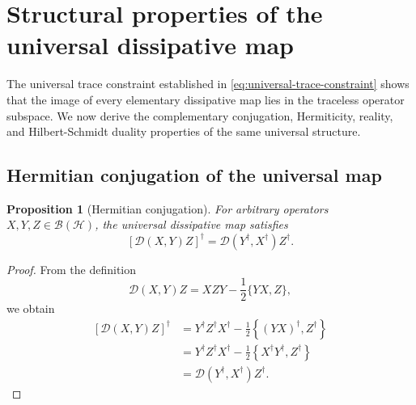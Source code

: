 \documentclass[notitlepage,aip,reprint,onecolumn]{revtex4-1}
\newtheorem{proposition}[theorem]{Proposition}
\theoremstyle{definition}
\begin{document}
\section{Structural properties of the universal dissipative map}\label{Sec:StructuralPropertiesDissipativeMap}

The universal trace constraint established in \eqref{eq:universal-trace-constraint} shows that the image of every elementary dissipative map lies in the traceless operator subspace. We now derive the complementary conjugation, Hermiticity, reality, and Hilbert-Schmidt duality properties of the same universal structure.

\subsection{Hermitian conjugation of the universal map}

\begin{proposition}[Hermitian conjugation]
For arbitrary operators \(X,Y,Z\in\mathcal B(\mathcal H)\), the universal dissipative map satisfies
\begin{equation}\label{eq:universal-Hermitian-conjugation}
    \left[
    \mathcal D(X,Y)Z
    \right]^\dagger
    =
    \mathcal D(Y^\dagger,X^\dagger)Z^\dagger.
\end{equation}
\end{proposition}

\begin{proof}
From the definition
\[
    \mathcal D(X,Y)Z
    =
    XZY
    -
    \frac12\{YX,Z\},
\]
we obtain
\begin{align*}
    \left[
    \mathcal D(X,Y)Z
    \right]^\dagger
    &=
    Y^\dagger Z^\dagger X^\dagger
    -
    \frac12
    \left\{
    (YX)^\dagger,Z^\dagger
    \right\}
    \\
    &=
    Y^\dagger Z^\dagger X^\dagger
    -
    \frac12
    \left\{
    X^\dagger Y^\dagger,Z^\dagger
    \right\}
    \\
    &=
    \mathcal D(Y^\dagger,X^\dagger)Z^\dagger.
\end{align*}
\end{proof}
\end{document}
